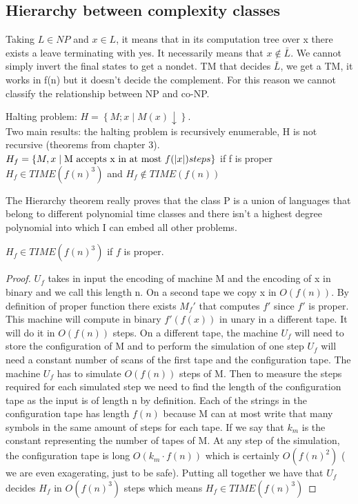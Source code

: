 \subsection{Hierarchy between complexity classes}
Taking $L \in NP$ and $x \in L$, it means that in its computation tree over x there exists a leave terminating with yes. It necessarily means that $x\notin \bar{L}$. We cannot simply invert the final states to get a nondet. TM that decides $\bar{L}$, we get a TM, it works in f(n) but it doesn't decide the complement. For this reason we cannot classify the relationship between NP and co-NP.
\begin{theorem}
    Halting problem: $H = \left\{ M;x \mid M(x) \downarrow \right\}$.\\ Two main results: the halting problem is recursively enumerable, H is not recursive (theorems from chapter 3). \\
    $H_f = \left\{ M,x \mid \text{M accepts x in at most } f(\left\lvert x\right\rvert) steps \right\}$ if f is proper $H_f \in TIME(f(n)^3)$ and $H_f\notin TIME(f(n))$
\end{theorem}
The Hierarchy theorem really proves that the class P is a union of languages that belong to different polynomial time classes and there isn't a highest degree polynomial into which I can embed all other problems.
\begin{lemma}
    $H_f \in TIME(f(n)^3)$ if $f$ is proper.
    \begin{proof}
        $U_f$ takes in input the encoding of machine M and the encoding of x in binary and we call this length n. On a second tape we copy x in $O(f(n))$. By definition of proper function there exists $M_f'$ that computes $f'$ since $f'$ is proper. This machine will compute in binary $f'(f(x))$ in unary in a different tape. It will do it in $O(f(n))$ steps. On a different tape, the machine $ U_f $ will need to store the configuration of M and to perform the simulation of one step $U_f$ will need a constant number of scans of the first tape and the configuration tape. The machine $U_f$ has to simulate $O(f(n))$ steps of M. Then to measure the steps required for each simulated step we need to find the length of the configuration tape as the input is of length n by definition. Each of the strings in the configuration tape has length $f(n)$ because M can at most write that many symbols in the same amount of steps for each tape. If we say that $k_m$ is the constant representing the number of tapes of M. At any step of the simulation, the configuration tape is long $O(k_m\cdot f(n))$ which is certainly $O(f(n)^2)$ ( we are even exagerating, just to be safe). Putting all together we have that $U_f$ decides $H_f$ in $O(f(n)^3)$ steps which means $H_f \in TIME(f(n)^3)$
    \end{proof}
\end{lemma}

